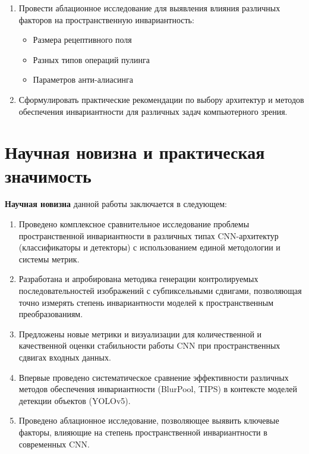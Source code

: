 \begin{enumerate}
    \item Провести аблационное исследование для выявления влияния различных факторов на пространственную инвариантность:
    \begin{itemize}
        \item Размера рецептивного поля
        \item Разных типов операций пулинга
        \item Параметров анти-алиасинга
    \end{itemize}
    
    \item Сформулировать практические рекомендации по выбору архитектур и методов обеспечения инвариантности для различных задач компьютерного зрения.
\end{enumerate}

\section*{Научная новизна и практическая значимость}
\label{intro:novelty}

\textbf{Научная новизна} данной работы заключается в следующем:

\begin{enumerate}
    \item Проведено комплексное сравнительное исследование проблемы пространственной инвариантности в различных типах CNN-архитектур (классификаторы и детекторы) с использованием единой методологии и системы метрик.
    
    \item Разработана и апробирована методика генерации контролируемых последовательностей изображений с субпиксельными сдвигами, позволяющая точно измерять степень инвариантности моделей к пространственным преобразованиям.
    
    \item Предложены новые метрики и визуализации для количественной и качественной оценки стабильности работы CNN при пространственных сдвигах входных данных.
    
    \item Впервые проведено систематическое сравнение эффективности различных методов обеспечения инвариантности (BlurPool, TIPS) в контексте моделей детекции объектов (YOLOv5).
    
    \item Проведено аблационное исследование, позволяющее выявить ключевые факторы, влияющие на степень пространственной инвариантности в современных CNN.
\end{enumerate}

